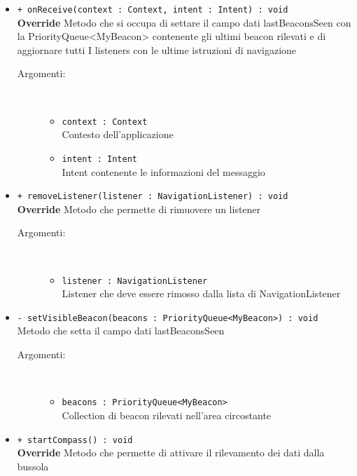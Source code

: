 \documentclass[../DefinizioneDiProdotto.tex]{subfiles}
\begin{document}
\begin{description}
\begin{itemize}
		\item \texttt{+ onReceive(context : Context, intent : Intent) : void}\\
		\textbf{Override} Metodo che si occupa di settare il campo dati lastBeaconsSeen con la PriorityQueue<MyBeacon> contenente gli ultimi beacon rilevati e di aggiornare tutti I listeners con le ultime istruzioni di navigazione
		\begin{description}
			\item[Argomenti:] \
			\begin{itemize}
				\item \texttt{context : Context}\\
				Contesto dell'applicazione\item \texttt{intent : Intent}\\
				Intent contenente le informazioni del messaggio\end{itemize}
		\end{description}
		\item \texttt{+ removeListener(listener : NavigationListener) : void}\\
		\textbf{Override} Metodo che permette di rimuovere un listener
		\begin{description}
			\item[Argomenti:] \
			\begin{itemize}
				\item \texttt{listener : NavigationListener}\\
				Listener che deve essere rimosso dalla lista di NavigationListener\end{itemize}
		\end{description}
		\item \texttt{- setVisibleBeacon(beacons : PriorityQueue<MyBeacon>) : void}\\
		Metodo che setta il campo dati lastBeaconsSeen
		\begin{description}
			\item[Argomenti:] \
			\begin{itemize}
				\item \texttt{beacons : PriorityQueue<MyBeacon>}\\
				Collection di beacon rilevati nell'area circostante\end{itemize}
		\end{description}
		\item \texttt{+ startCompass() : void}\\
		\textbf{Override} Metodo che permette di attivare il rilevamento dei dati dalla bussola

\end{itemize}
\end{description}
\end{document}
